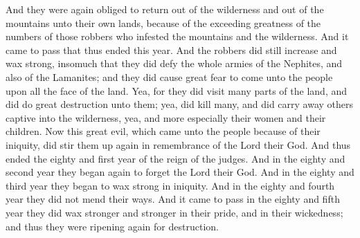 And they were again obliged to return out of the wilderness and out of the mountains unto their own lands, because of the exceeding greatness of the numbers of those robbers who infested the mountains and the wilderness.
\bverse \iffalse And it came to pass that thus ended this year. And the robbers did still increase and wax strong, insomuch that they did defy the whole armies of the Nephites, and also of the Lamanites; and they did cause great fear to come unto the people upon all the face of the land. \fi
And it came to pass that thus ended this year. And the robbers did still increase and wax strong, insomuch that they did defy the whole armies of the Nephites, and also of the Lamanites; and they did cause great fear to come unto the people upon all the face of the land.
\bverse \iffalse Yea, for they did visit many parts of the land, and did do great destruction unto them; yea, did kill many, and did carry away others captive into the wilderness, yea, and more especially their women and their children. \fi
Yea, for they did visit many parts of the land, and did do great destruction unto them; yea, did kill many, and did carry away others captive into the wilderness, yea, and more especially their women and their children.
\bverse \iffalse Now this great evil, which came unto the people because of their iniquity, did stir them up again in remembrance of the Lord their God. \fi
Now this great evil, which came unto the people because of their iniquity, did stir them up again in remembrance of the Lord their God.
\bverse \iffalse And thus ended the eighty and first year of the reign of the judges. \fi
And thus ended the eighty and first year of the reign of the judges.
\bverse \iffalse And in the eighty and second year they began again to forget the Lord their God. And in the eighty and third year they began to wax strong in iniquity. And in the eighty and fourth year they did not mend their ways. \fi
And in the eighty and second year they began again to forget the Lord their God. And in the eighty and third year they began to wax strong in iniquity. And in the eighty and fourth year they did not mend their ways.
\bverse \iffalse And it came to pass in the eighty and fifth year they did wax stronger and stronger in their pride, and in their wickedness; and thus they were ripening again for destruction. \fi
And it came to pass in the eighty and fifth year they did wax stronger and stronger in their pride, and in their wickedness; and thus they were ripening again for destruction.

